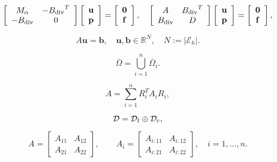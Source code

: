\documentclass[11pt]{article}
\begin{document}
\begin{equation}\label{eq:saddle_point_sys}
 \left[
\begin{array}{cc}
{{M}_{{\alpha}}} & -{B_{\operatorname{div}}}^T \\
-{B_{\operatorname{div}}} & 0
\end{array}
\right]
\left[
\begin{array}{c}
 {\bf u} \\
 {\bf p}
\end{array}
\right]=
\left[
\begin{array}{c}
 \bf{0} \\
 \bf{f}
\end{array}
\right], 
\quad
\left[
\begin{array}{cc}
 A & {B_{\operatorname{div}}}^T \\
{B_{\operatorname{div}}} & D
\end{array}
\right]
\left[
\begin{array}{c}
 {\bf u} \\
 {\bf p}
\end{array}
\right]=
\left[
\begin{array}{c}
 \bf{0} \\
 \bf{f}
\end{array}
\right], 
\end{equation}

\begin{equation}\label{algebraic-hdiv}
A {{\mathbf u}} = {{\mathbf b}}, \quad {{\mathbf u}}, {{\mathbf b}} \in  \mathbb{R}^N, \quad N:={|\mathcal{E}_h|}.
\end{equation}

\begin{equation*}
 \overline{\Omega}=\bigcup_{i=1}^{n} \overline{\Omega}_{i}.
\end{equation*}

$$
A=\sum_{i=1}^{n} R_{{i}}^T A_{{i}} R_{{i}},
$$

\begin{equation}\label{eq:partitioning_DOF}
\mathcal{D} = \mathcal{D}_{\rm f} \oplus \mathcal{D}_{\rm c},
\end{equation}

\begin{equation}\label{eq:A_two_by_two-x}
A=\left[
        \begin{array}{cc}
        A_{11} & A_{12} \\
        A_{21} & A_{22}
        \end{array}
\right],\qquad
 A_{i}=\left[
        \begin{array}{cc}
        A_{i:11} & A_{i:12} \\
        A_{i:21} & A_{i:22}
        \end{array}
\right], \quad i=1,\dots,n.
\end{equation}
\end{document}
